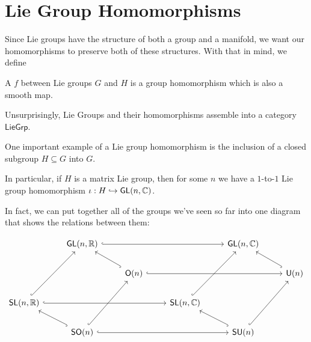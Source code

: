 \documentclass[../main.tex]{subfiles}
\begin{document}

\section{Lie Group Homomorphisms}

Since Lie groups have the structure of both a group and a manifold, 
we want our homomorphisms to preserve both of these structures. With that
in mind, we define

\begin{defn}
  A  $f$ between Lie groups $G$ and $H$ 
  is a group homomorphism which is also a smooth map.

  Unsurprisingly, Lie Groups and their homomorphisms assemble into a category
  $\mathsf{LieGrp}$.
\end{defn}

One important example of a Lie group homomorphism is the inclusion of a 
closed subgroup $H \subseteq G$ into $G$. 

In particular, if $H$ is a matrix Lie group, then for some $n$ 
we have a $1$-to-$1$ Lie group homomorphism 
$\iota : H \hookrightarrow \mathsf{GL}(n,\mathbb{C})$.

In fact, we can put together all of the groups we've seen so far into one 
diagram that shows the relations between them:

\[\begin{tikzcd}
  & {\mathsf{GL}(n,\mathbb{R})} &&& {\mathsf{GL}(n,\mathbb{C})} \\
	&& {\mathsf{O}(n)} &&& {\mathsf{U}(n)} \\
	{\mathsf{SL}(n,\mathbb{R})} &&& {\mathsf{SL}(n,\mathbb{C})} \\
	& {\mathsf{SO}(n)} &&& {\mathsf{SU}(n)}
	\arrow[hook, from=4-2, to=3-1]
	\arrow[hook, from=3-1, to=1-2]
	\arrow[hook, from=4-2, to=2-3]
	\arrow[hook, from=2-3, to=1-2]
	\arrow[hook, from=4-5, to=2-6]
	\arrow[hook, from=4-5, to=3-4]
	\arrow[hook, from=3-4, to=1-5]
	\arrow[hook, from=2-6, to=1-5]
	\arrow[hook, from=1-2, to=1-5]
	\arrow[hook, from=3-1, to=3-4]
	\arrow[hook, from=4-2, to=4-5]
	\arrow[hook, from=2-3, to=2-6]
\end{tikzcd}\]
\end{document}
